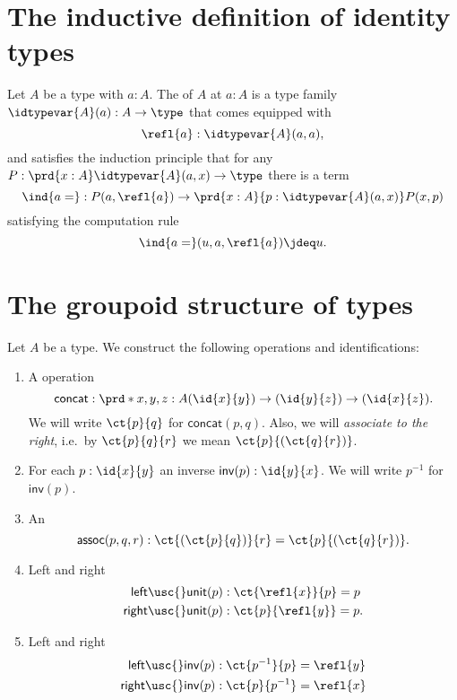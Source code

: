 \section{The inductive definition of identity types}
\begin{defn}
Let $A$ be a type with $a:A$. The  of $A$ at $a:A$ is a type family $\idtypevar{A}(a):A\to\type$ that comes equipped with
\begin{equation*}
\refl{a} : \idtypevar{A}(a,a),
\end{equation*}
and satisfies the induction principle that for any $P:\prd{x:A}\idtypevar{A}(a,x)\to\type$ there is a term
\begin{equation*}
\ind{a=} : P(a,\refl{a})\to \prd{x:A}{p:\idtypevar{A}(a,x)}P(x,p)
\end{equation*}
satisfying the computation rule
\begin{equation*}
\ind{a=}(u,a,\refl{a})\jdeq u.
\end{equation*}
\end{defn}

\section{The groupoid structure of types}\label{sec:groupoid}
\begin{defn}\label{defn:groupoid}
Let $A$ be a type. We construct the following operations and identifications:
\begin{enumerate}
\item A  operation
\begin{equation*}
\mathsf{concat} : \prd*{x,y,z:A} (\id{x}{y})\to(\id{y}{z})\to (\id{x}{z}).
\end{equation*}
We will write $\ct{p}{q}$ for $\mathsf{concat}(p,q)$. Also, we will \emph{associate to the right}, i.e.~by $\ct{p}{q}{r}$ we mean $\ct{p}{(\ct{q}{r})}$.
\item For each $p:\id{x}{y}$ an inverse $\mathsf{inv}(p):\id{y}{x}$. We will write $p^{-1}$ for $\mathsf{inv}(p)$.
\item An 
\begin{equation*}
\mathsf{assoc}(p,q,r) : \ct{(\ct{p}{q})}{r}=\ct{p}{(\ct{q}{r})}.
\end{equation*}
\item Left and right 
\begin{align*}
\mathsf{left\usc{}unit}(p) & : \ct{\refl{x}}{p}=p \\
\mathsf{right\usc{}unit}(p) & : \ct{p}{\refl{y}}=p.
\end{align*}
\item Left and right 
\begin{align*}
\mathsf{left\usc{}inv}(p) & : \ct{p^{-1}}{p} = \refl{y} \\
\mathsf{right\usc{}inv}(p) & : \ct{p}{p^{-1}} = \refl{x}
\end{align*}
\end{enumerate}
\end{defn}

